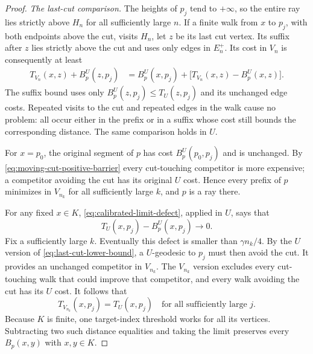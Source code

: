 \begin{proof}
\emph{The last-cut comparison.}
The heights of $p_j$ tend to $+\infty$, so the entire ray lies
strictly above $H_n$ for all sufficiently large $n$.  If a finite
walk from $x$ to $p_j$, with both endpoints above the cut, visits
$H_n$, let $z$ be its last cut vertex.  Its suffix after $z$ lies
strictly above the cut and uses only edges in $E_n^+$.  Its cost in
$V_n$ is consequently at least
\begin{align}
 T_{V_n}(x,z)+B_p^U(z,p_j)
 &=B_p^U(x,p_j)
   +\bigl[T_{V_n}(x,z)-B_p^U(x,z)\bigr].
 \label{eq:last-cut-lower-bound}
\end{align}
The suffix bound uses only $B_p^U(z,p_j)\le T_U(z,p_j)$ and its
unchanged edge costs.  Repeated visits to the cut and repeated edges
in the walk cause no problem: all occur either in the prefix or in
a suffix whose cost still bounds the corresponding distance.  The
same comparison holds in $U$.

For $x=p_0$, the original segment of $p$ has cost
$B_p^U(p_0,p_j)$ and is unchanged.  By
\eqref{eq:moving-cut-positive-barrier} every cut-touching competitor
is more expensive; a competitor avoiding the cut has its original
$U$ cost.  Hence every prefix of $p$ minimizes in $V_{n_k}$ for all
sufficiently large $k$, and $p$ is a ray there.

For any fixed $x\in K$, \eqref{eq:calibrated-limit-defect}, applied in
$U$, says that
\[
 T_U(x,p_j)-B_p^U(x,p_j)\longrightarrow0.
\]
Fix a sufficiently large $k$.  Eventually this defect is smaller
than $\gamma n_k/4$.  By the $U$ version of
\eqref{eq:last-cut-lower-bound}, a $U$-geodesic to $p_j$ must then
avoid the cut.  It provides an unchanged competitor in $V_{n_k}$.
The $V_{n_k}$ version excludes every cut-touching walk that could
improve that competitor, and every walk avoiding the cut has its
$U$ cost.  It follows that
\begin{equation}
 T_{V_{n_k}}(x,p_j)=T_U(x,p_j)
 \quad\text{for all sufficiently large }j.
 \label{eq:finite-witness-distance-equality}
\end{equation}
Because $K$ is finite, one target-index threshold works for all its
vertices.  Subtracting two such distance equalities and taking the
limit preserves every $B_p(x,y)$ with $x,y\in K$.


\end{proof}

